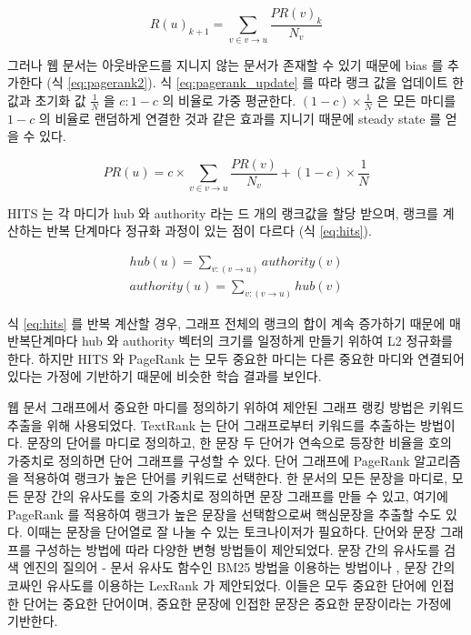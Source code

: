 \documentclass[11pt]{article}
\begin{document}
\begin{equation}
  \label{eq:pagerank_update}
  R(u)_{k+1} = \sum_{v \in v \rightarrow u} \frac{PR(v)_k}{N_v}
\end{equation}

그러나 웹 문서는 아웃바운드를 지니지 않는 문서가 존재할 수 있기 때문에 bias 를 추가한다 (식 \ref{eq:pagerank2}).
식 \ref{eq:pagerank_update} 를 따라 랭크 값을 업데이트 한 값과 초기화 값 $\frac{1}{N}$ 을 $c : 1-c$ 의 비율로 가중 평균한다.
$(1-c) \times \frac{1}{N}$ 은 모든 마디를 $1-c$ 의 비율로 랜덤하게 연결한 것과 같은 효과를 지니기 때문에 steady state 를 얻을 수 있다.

\begin{equation}
  \label{eq:pagerank2}
  PR(u) = c \times \sum_{v \in v \rightarrow u} \frac{PR(v)}{N_v} + (1-c) \times \frac{1}{N}
\end{equation}

HITS 는 각 마디가 hub 와 authority 라는 드 개의 랭크값을 할당 받으며, 랭크를 계산하는 반복 단계마다 정규화 과정이 있는 점이 다르다 (식 \ref{eq:hits}).

\begin{equation}
  \label{eq:hits}
  \begin{aligned}
  hub(u) = \sum_{v:(v \rightarrow u)} authority(v) \\
  authority(u) = \sum_{v:(v \rightarrow u)} hub(v)
  \end{aligned}
\end{equation}

식 \ref{eq:hits} 를 반복 계산할 경우, 그래프 전체의 랭크의 합이 계속 증가하기 때문에 매 반복단계마다 hub 와 authority 벡터의 크기를 일정하게 만들기 위하여 L2 정규화를 한다.
하지만 HITS 와 PageRank 는 모두 중요한 마디는 다른 중요한 마디와 연결되어 있다는 가정에 기반하기 때문에 비슷한 학습 결과를 보인다.

웹 문서 그래프에서 중요한 마디를 정의하기 위하여 제안된 그래프 랭킹 방법은 키워드 추출을 위해 사용되었다.
TextRank \citep{mihalcea2004textrank} 는 단어 그래프로부터 키워드를 추출하는 방법이다.
문장의 단어를 마디로 정의하고, 한 문장 두 단어가 연속으로 등장한 비율을 호의 가중치로 정의하면 단어 그래프를 구성할 수 있다.
단어 그래프에 PageRank 알고리즘을 적용하여 랭크가 높은 단어를 키워드로 선택한다.
한 문서의 모든 문장을 마디로, 모든 문장 간의 유사도를 호의 가중치로 정의하면 문장 그래프를 만들 수 있고, 여기에 PageRank 를 적용하여 랭크가 높은 문장을 선택함으로써 핵심문장을 추출할 수도 있다.
이때는 문장을 단어열로 잘 나눌 수 있는 토크나이저가 필요하다.
단어와 문장 그래프를 구성하는 방법에 따라 다양한 변형 방법들이 제안되었다.
문장 간의 유사도를 검색 엔진의 질의어 - 문서 유사도 함수인 BM25 \citep{robertson2009probabilistic} 방법을 이용하는 방법이나 \citep{barrios2016variations}, 문장 간의 코싸인 유사도를 이용하는 LexRank \citep{erkan2004lexrank} 가 제안되었다.
이들은 모두 중요한 단어에 인접한 단어는 중요한 단어이며, 중요한 문장에 인접한 문장은 중요한 문장이라는 가정에 기반한다.
\end{document}
